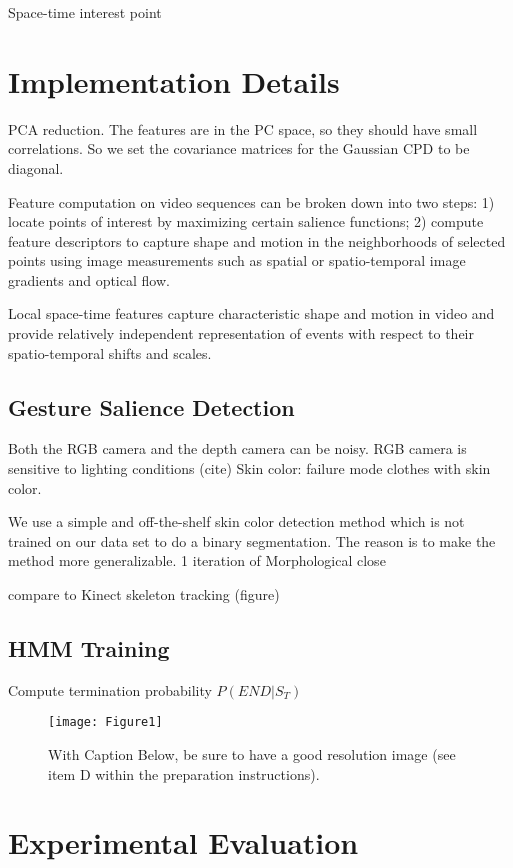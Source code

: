 \documentclass{sigchi}
\begin{document}
Space-time interest point
\section{Implementation Details}
PCA reduction. The features are in the PC space, so they should have small correlations.
So we set the covariance matrices for the Gaussian CPD to be diagonal.

Feature computation on video sequences can be broken down into two steps: 1)
locate points of interest by maximizing certain salience functions; 2) compute
feature descriptors to capture shape and motion in the neighborhoods of selected
points using image measurements such as spatial or spatio-temporal image
gradients and optical flow.

Local space-time features capture characteristic shape and motion in video and
provide relatively independent representation of events with respect to their
spatio-temporal shifts and scales. \cite{wang-spatio-2009}


\cite{wang-spatio-2009}
\subsection{Gesture Salience Detection}
Both the RGB camera and the depth camera can be noisy. RGB camera is sensitive to lighting conditions (cite)
Skin color: failure mode clothes with skin color.

We use a simple and off-the-shelf skin color detection method which is not trained on our data set to do a binary segmentation. The reason is
to make the method more generalizable. 1 iteration of Morphological close

compare to Kinect skeleton tracking (figure)

\subsection{HMM Training}

Compute termination probability $P(END|S_T)$

\begin{figure}[!h]
\centering
\texttt{[image: Figure1]}
\caption{With Caption Below, be sure to have a good resolution image
  (see item D within the preparation instructions).}
\label{fig:figure1}
\end{figure}


\section{Experimental Evaluation}
\end{document}
